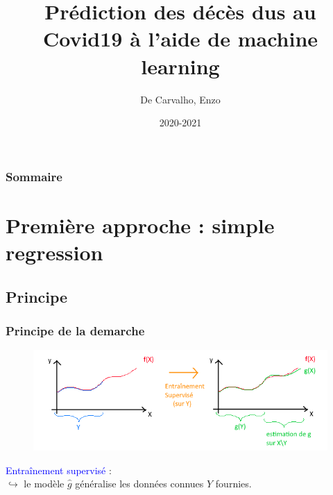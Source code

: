 \documentclass{beamer}[aspectratio = 43]
\title{Prédiction des décès dus au Covid19 à l'aide de machine learning}
\subtitle{}
\author{De Carvalho, Enzo}
\institute{numéro d'inscription : 29448}
\date{2020-2021}
\begin{document}
\begin{frame}
	\maketitle
\end{frame}

\begin{frame}
	\frametitle{Sommaire}
	\tableofcontents
\end{frame}

\section{Première approche : simple regression}
\subsection{Principe}
\begin{frame}
	\frametitle{Principe de la demarche}
	\begin{figure}[t]
		\centering
		\includegraphics[scale=0.65]{super_schema}
	\end{figure}
	\textcolor{blue}{Entraînement supervisé} :\\
	$\hookrightarrow$ le modèle $\hat{g}$ généralise les données connues $Y$ fournies.
\end{frame}
\end{document}
